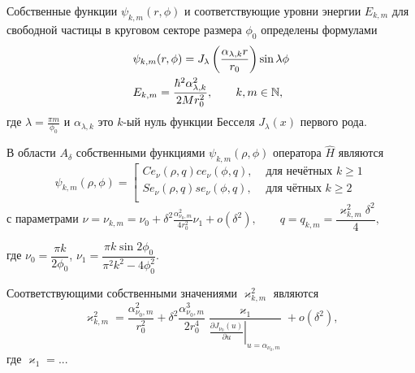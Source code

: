 \begin{frame}
\begin{mytheorem}
Собственные функции  $\psi_{k,m}(r,\phi)$ и соответствующие уровни энергии $E_{k,m}$ для свободной частицы в круговом секторе размера  $\phi_0$
определены формулами 
\begin{align*}
&\psi_{k, m}(r, \phi) = J_\lambda\left(\frac{\alpha_{\lambda, k}r}{r_0}\right)\sin{\lambda\phi}\notag \\  
&E_{k,m} = \frac{\hbar^2 \alpha_{\lambda, k}^2}{2M r_0^2},
 \qquad k, m \in \mathbb{N},
\end{align*}
где
$\lambda = \frac{\pi m}{\phi_0}$ и $\alpha_{\lambda, k}$ это
$k$-ый нуль функции Бесселя  $J_\lambda(x)$  первого рода.
\end{mytheorem}
\end{frame}


\begin{frame}
\begin{mytheorem}[A]\label{th:A}
В области $A_\delta$ собственными функциями $\psi_{k, m}(\rho, \phi)$ оператора $\hat{H}$ являются
\begin{equation*}
\psi_{k, m}(\rho, \phi) = 
\left[
\begin{array}{ll}
    Ce_\nu(\rho, q) ce_\nu(\phi, q) ,   &    \text{ для нечётных $k \geq 1$}\\
    Se_\nu(\rho, q) se_\nu(\phi, q) ,   &    \text{ для чётных $k \geq 2$}\\
\end{array}
\right.
\end{equation*}
с параметрами
$\nu = \nu_{k,m} = \nu_0+ \delta^2 \frac{\alpha_{\nu_0, m}^2}{4 r_0^2}  \nu_1 + o(\delta^2), \qquad q=q_{k,m} = \dfrac{\varkappa_{k,m}^2 \delta^2}{4},$

где
$\nu_0 = \dfrac{\pi k}{2\phi_0}$,
$\nu_1=\dfrac{\pi k \sin 2\phi_0}{\pi^2 k^2 - 4\phi_0^2}.$

Соответствующими собственными значениями   $\varkappa^2_{k, m}$ являются
\begin{equation*}
\varkappa^2_{k, m} = \dfrac{\alpha_{\nu_0, m}^2}{r_0^2} +
\delta^2 \dfrac{\alpha_{\nu_0, m}^3}{2 r_0^4}\dfrac{\varkappa_1 }{ \left.\frac{\partial J_{\nu_0}(u)}{\partial u}\right|_{u=\alpha_{\nu_0, m}} } + o(\delta^2),
\end{equation*}
где $\varkappa_1 = ...$
\end{mytheorem}
\end{frame} 

